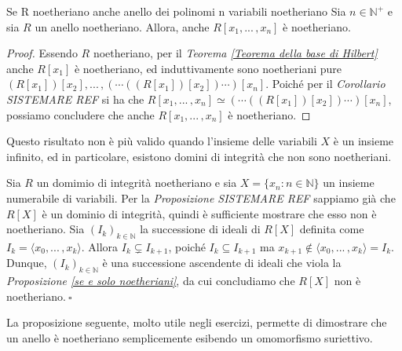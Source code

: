 \begin{cor}[]{Se R noetheriano anche anello dei polinomi n variabili noetheriano}
  Sia $n\in \mathbb{N}^+$ e sia $R$ un anello noetheriano. Allora, anche $R[x_1,...\,,x_n]$ è noetheriano.
\end{cor}
\vspace{-4mm}
\begin{proof}
  Essendo $R$ noetheriano, per il \emph{Teorema \ref{Teorema della base di Hilbert}} anche $R[x_1]$ è noetheriano, 
  ed induttivamente sono noetheriani pure $(R[x_1])[x_2],...\,, (\cdots((R[x_1])[x_2])\cdots )[x_n]$. 
  Poiché per il \emph{Corollario SISTEMARE REF} si ha che $R[x_1,...\,,x_n]\simeq (\cdots((R[x_1])[x_2])\cdots )[x_n]$, 
  possiamo concludere che anche $R[x_1,...\,,x_n]$ è noetheriano.
\end{proof}

\noindent Questo risultato non è più valido quando l'insieme delle variabili $X$ è un insieme infinito, ed in particolare, 
esistono domini di integrità che non sono noetheriani.

\begin{exm}
  Sia $R$ un domimio di integrità noetheriano e sia $X=\{x_n : n\in \mathbb{N}\}$ un insieme numerabile di variabili. 
  Per la \emph{Proposizione SISTEMARE REF} sappiamo già che $R[X]$ è un dominio di integrità, quindi è sufficiente mostrare che esso non è noetheriano. 
  Sia $(I_k)_{k\in \mathbb{N}}$ la successione di ideali di $R[X]$ definita come $I_k=\langle x_0,...\,,x_k \rangle$. 
  Allora $I_k\varsubsetneq I_{k+1}$, poiché $I_k\subseteq I_{k+1}$ ma $x_{k+1}\not\in \langle x_0, ...\,,x_k\rangle=I_k$. 
  Dunque, $(I_k)_{k\in \mathbb{N}}$ è una successione ascendente di ideali che viola la \emph{Proposizione \ref{se e solo noetheriani}}, 
  da cui concludiamo che $R[X]$ non è noetheriano$. \ \square$
\end{exm}

\noindent La proposizione seguente, molto utile negli esercizi, permette di dimostrare che un anello è noetheriano semplicemente 
esibendo un omomorfismo suriettivo.

